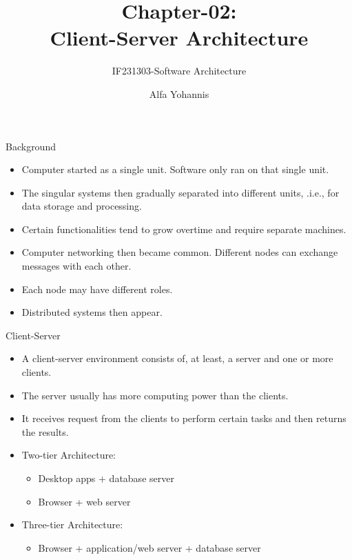 \documentclass[aspectratio=169, table]{beamer}
\title{\huge Chapter-02:\\Client-Server Architecture}
\subtitle{IF231303-Software Architecture}
\author{Alfa Yohannis}
\begin{document}
	\begin{frame}[plain]
		\maketitle
	\end{frame}

	\begin{frame}{Background}
		\begin{itemize}
			\item Computer started as a single unit.  Software only ran on that single unit.
			\item The singular systems then gradually separated into different units, .i.e., for data storage and processing.
			\item Certain functionalities tend to grow overtime and require separate machines.
			\item Computer networking then became common. Different nodes can exchange messages with each other.
			\item Each node may have different roles.
			\item Distributed systems then appear.
		\end{itemize}
	\end{frame}

	\begin{frame}{Client-Server}
		\begin{itemize}
			\item A client-server environment consists of, at least, a server and one or more clients.
			\item The server usually has more computing power than the clients.
			\item It receives request from the clients to perform certain tasks and then returns the results.
			\item Two-tier Architecture:
			\begin{itemize}
				\item Desktop apps + database server
				\item Browser + web server
			\end{itemize}
			\item Three-tier Architecture:
			\begin{itemize}
				\item Browser + application/web server + database server
			\end{itemize}
		\end{itemize}
	\end{frame}
\end{document}
